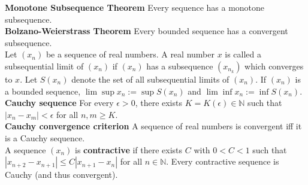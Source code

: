 \documentclass[10pt,landscape]{article}
\begin{document}
\begin{multicols}{3}
 \textbf{Monotone Subsequence Theorem} Every sequence has a monotone subsequence.\\
 \textbf{Bolzano-Weierstrass Theorem} Every bounded sequence has a convergent subsequence.\\
 Let $(x_n)$ be a sequence of real numbers. A real number  $x$ is called a subsequential limit of  $(x_n)$ if  $(x_n)$ has a subsequence  $(x_{n_k})$ which converges to  $x$. Let $S(x_n)$ denote the set of all subsequential limits of  $(x_n)$. If  $(x_n)$ is a bounded sequence,  $\lim\sup x_n:=\sup S(x_n)$ and  $\lim\inf x_n:=\inf S(x_n)$.\\
 \textbf{Cauchy sequence} For every $\epsilon>0$, there exists  $K=K(\epsilon)\in\mathbb{N}$ such that  $|x_n-x_m|<\epsilon$ for all  $n,m\geq K$.\\
 \textbf{Cauchy convergence criterion} A sequence of real numbers is convergent iff it is a Cauchy sequence.\\
 A sequence  $(x_n)$ is \textbf{contractive} if there exists  $C$ with  $0<C<1$ such that  $|x_{n+2}-x_{n+1}|\leq C|x_{n+1}-x_n|$ for all $n\in\mathbb{N}$. Every contractive sequence is Cauchy (and thus convergent).


\end{multicols}
\end{document}
